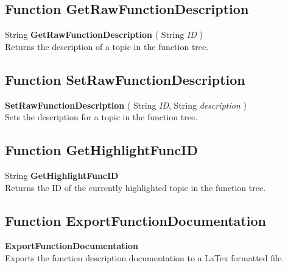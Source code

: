 \subsection{Function GetRawFunctionDescription \label{F:GetRawFunctionDescription}}
String \textbf{GetRawFunctionDescription} ( String \textit{ID} ) \\
Returns the description of a topic in the function tree.

\subsection{Function SetRawFunctionDescription \label{F:SetRawFunctionDescription}}
\textbf{SetRawFunctionDescription} ( String \textit{ID}, String \textit{description} ) \\
Sets the description for a topic in the function tree.

\subsection{Function GetHighlightFuncID \label{F:GetHighlightFuncID}}
String \textbf{GetHighlightFuncID} \\
Returns the ID of the currently highlighted topic in the function tree.

\subsection{Function ExportFunctionDocumentation \label{F:ExportFunctionDocumentation}}
\textbf{ExportFunctionDocumentation} \\
Exports the function description documentation to a LaTex formatted file.

